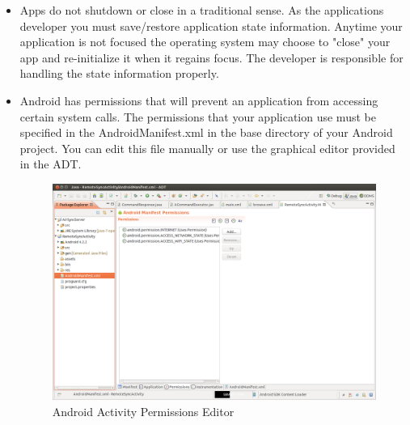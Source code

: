 \documentclass[12pt]{article}
\begin{document}
\begin{itemize}
\item Apps do not shutdown or close in a traditional sense. As the applications developer you must save/restore application state information. Anytime your application is not focused the operating system may choose to "close" your app and re-initialize it when it regains focus. The developer is responsible for handling the state information properly.

\item Android has permissions that will prevent an application from accessing certain system calls. The permissions that your application use must be specified in the AndroidManifest.xml in the base directory of your Android project. You can edit this file manually or use the graphical editor provided in the ADT.
\begin{figure}[H]
\center
\includegraphics[width=1\textwidth]{permissions.png}
\caption{Android Activity Permissions Editor}
\end{figure}


\end{itemize}
\end{document}
